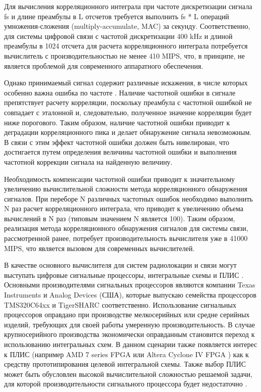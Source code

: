 Для вычисления корреляционного интеграла при частоте дискретизации сигнала fs и длине преамбулы в L отсчетов требуется выполнить fs * L операций умножения-сложения (multiply-accumulate, MAC) за секунду. Соответственно, для системы цифровой связи с частотой дискретизации 400 kHz и длиной преамбулы в 1024 отсчета для расчета корреляционного интеграла потребуется вычислитель с производительностью не менее 410 MIPS, что, в принципе, не является проблемой для современного аппаратного обеспечения. 
	
Однако принимаемый сигнал содержит различные искажения, в числе которых особенно важна ошибка по частоте \cite{mengali_sync}. Наличие частотной ошибки в сигнале препятствует расчету корреляции, поскольку преамбула с частотной ошибкой не совпадает с эталонной и, следовательно, полученное значение корреляции будет ниже порогового. Таким образом, наличие частотной ошибки приводит к деградации корреляционного пика и делает обнаружение сигнала невозможным. В связи с этим эффект частотной ошибки должен быть нивелирован, что достигается путем определения величины частотной ошибки и выполнения частотной коррекции сигнала на найденную величину.

Необходимость компенсации частотной ошибки приводит к значительному увеличению вычислительной сложности метода корреляционного обнаружения сигналов. При переборе N различных частотных ошибок необходимо выполнить N раз расчет корреляционного интеграла, что приводит к увеличению объема вычислений в N раз (типовым значением N является 100). Таким образом, реализация метода корреляционного обнаружения сигналов для системы связи, рассмотренной ранее, потребует производительность вычислителя уже в 41000 MIPS, что является вызовом для современных вычислителей.

В качестве основного вычислителя для систем радиолокации и связи могут выступать цифровые сигнальные процессоры, интегральные схемы и ПЛИС \cite{adams_architecture_choice}. Основными производителями сигнальных процессоров являются компании Texas Instruments и Analog Devices (США), которые выпускаю семейства процессоров TMS320C64xx \cite{tms_overview} и TigerSHARC \cite{tsharc_product_brief} соответственно. Использование сигнальных процессоров оправдано при производстве мелкосерийных или средне серийных изделий, требующих для своей работы умеренную производительность. В случае крупносерийного производства экономически оправданным становится переход к использованию интегральных схем. В данном сценарии также появляется интерес к ПЛИС (например AMD 7 series FPGA \cite{xilinx_7_overview} или  Altera Cyclone IV FPGA \cite{cyclone_iv_overview}) как к средству прототипирования целевой интегральной схемы. Также выбор  ПЛИС может быть обусловлен высокой вычислительной сложностью решаемой задачи, для которой производительности сигнального процессора будет недостаточно \cite{fpgas_dsp_applications}.

